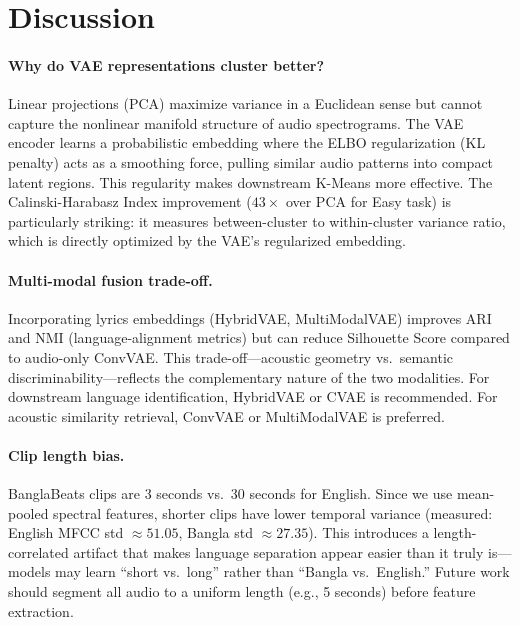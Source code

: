 \documentclass{article}
\begin{document}
\section{Discussion}
\label{sec:discussion}

\paragraph{Why do VAE representations cluster better?}
Linear projections (PCA) maximize variance in a Euclidean sense but cannot capture the nonlinear manifold structure of audio spectrograms. The VAE encoder learns a probabilistic embedding where the ELBO regularization (KL penalty) acts as a smoothing force, pulling similar audio patterns into compact latent regions. This regularity makes downstream K-Means more effective. The Calinski-Harabasz Index improvement ($43\times$ over PCA for Easy task) is particularly striking: it measures between-cluster to within-cluster variance ratio, which is directly optimized by the VAE's regularized embedding.

\paragraph{Multi-modal fusion trade-off.}
Incorporating lyrics embeddings (HybridVAE, MultiModalVAE) improves ARI and NMI (language-alignment metrics) but can reduce Silhouette Score compared to audio-only ConvVAE. This trade-off---acoustic geometry vs.\ semantic discriminability---reflects the complementary nature of the two modalities. For downstream language identification, HybridVAE or CVAE is recommended. For acoustic similarity retrieval, ConvVAE or MultiModalVAE is preferred.

\paragraph{Clip length bias.}
BanglaBeats clips are 3 seconds vs.\ 30 seconds for English. Since we use mean-pooled spectral features, shorter clips have lower temporal variance (measured: English MFCC std $\approx 51.05$, Bangla std $\approx 27.35$). This introduces a length-correlated artifact that makes language separation appear easier than it truly is---models may learn ``short vs.\ long'' rather than ``Bangla vs.\ English.'' Future work should segment all audio to a uniform length (e.g., 5 seconds) before feature extraction.
\end{document}
